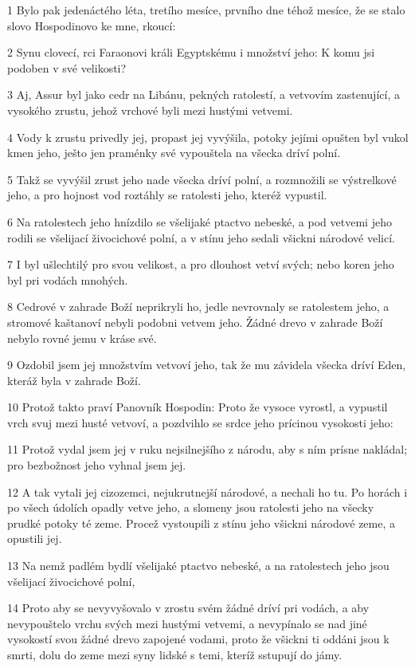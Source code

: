 \par 1 Bylo pak jedenáctého léta, tretího mesíce, prvního dne téhož mesíce, že se stalo slovo Hospodinovo ke mne, rkoucí:
\par 2 Synu clovecí, rci Faraonovi králi Egyptskému i množství jeho: K komu jsi podoben v své velikosti?
\par 3 Aj, Assur byl jako cedr na Libánu, pekných ratolestí, a vetvovím zastenující, a vysokého zrustu, jehož vrchové byli mezi hustými vetvemi.
\par 4 Vody k zrustu privedly jej, propast jej vyvýšila, potoky jejími opušten byl vukol kmen jeho, ješto jen praménky své vypouštela na všecka dríví polní.
\par 5 Takž se vyvýšil zrust jeho nade všecka dríví polní, a rozmnožili se výstrelkové jeho, a pro hojnost vod roztáhly se ratolesti jeho, kteréž vypustil.
\par 6 Na ratolestech jeho hnízdilo se všelijaké ptactvo nebeské, a pod vetvemi jeho rodili se všelijací živocichové polní, a v stínu jeho sedali všickni národové velicí.
\par 7 I byl ušlechtilý pro svou velikost, a pro dlouhost vetví svých; nebo koren jeho byl pri vodách mnohých.
\par 8 Cedrové v zahrade Boží neprikryli ho, jedle nevrovnaly se ratolestem jeho, a stromové kaštanoví nebyli podobni vetvem jeho. Žádné drevo v zahrade Boží nebylo rovné jemu v kráse své.
\par 9 Ozdobil jsem jej množstvím vetvoví jeho, tak že mu závidela všecka dríví Eden, kteráž byla v zahrade Boží.
\par 10 Protož takto praví Panovník Hospodin: Proto že vysoce vyrostl, a vypustil vrch svuj mezi husté vetvoví, a pozdvihlo se srdce jeho prícinou vysokosti jeho:
\par 11 Protož vydal jsem jej v ruku nejsilnejšího z národu, aby s ním prísne nakládal; pro bezbožnost jeho vyhnal jsem jej.
\par 12 A tak vytali jej cizozemci, nejukrutnejší národové, a nechali ho tu. Po horách i po všech údolích opadly vetve jeho, a slomeny jsou ratolesti jeho na všecky prudké potoky té zeme. Procež vystoupili z stínu jeho všickni národové zeme, a opustili jej.
\par 13 Na nemž padlém bydlí všelijaké ptactvo nebeské, a na ratolestech jeho jsou všelijací živocichové polní,
\par 14 Proto aby se nevyvyšovalo v zrostu svém žádné dríví pri vodách, a aby nevypouštelo vrchu svých mezi hustými vetvemi, a nevypínalo se nad jiné vysokostí svou žádné drevo zapojené vodami, proto že všickni ti oddáni jsou k smrti, dolu do zeme mezi syny lidské s temi, kteríž sstupují do jámy.
